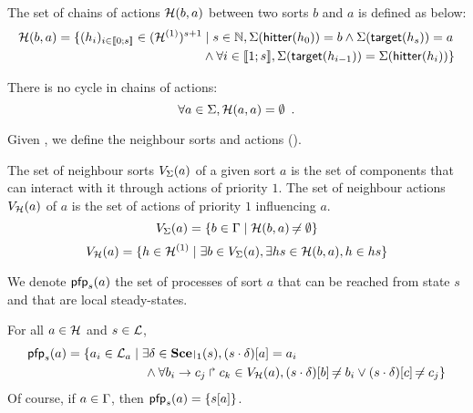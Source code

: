 \begin{definition}
\label{def:chainsactions}
  The set of chains of actions $\mathcal{H}(b, a)$ between two sorts $b$ and $a$ is defined as below:
  \begin{align*}
  \mathcal{H}(b, a) = \{ (h_i)_{i \in \llbracket 0; s \rrbracket} \in (\mathcal{H}^{(1)})^{s+1} &\mid s \in \mathbb{N}, \Sigma(\mathsf{hitter}(h_0)) = b \wedge \Sigma(\mathsf{target}(h_s)) = a \\
    & \wedge \forall i \in \llbracket 1; s \rrbracket, \Sigma(\mathsf{target}(h_{i-1})) = \Sigma(\mathsf{hitter}(h_{i})) \}
  \end{align*}
\end{definition}

\begin{criterion}
\label{cr:cyclefreeness}
  There is no cycle in chains of actions:
  $$\forall a \in \Sigma, \mathcal{H}(a, a) = \emptyset \enspace.$$
\end{criterion}

Given , we define the neighbour  sorts and actions ().
\begin{definition}
\label{def:neighbors}
  The set of neighbour sorts $V_\Sigma(a)$ of a given sort $a$ is the set of components that can interact with it through actions of priority $1$.
  The set of neighbour actions $V_{\mathcal{H}}(a)$ of $a$ is the set of actions of priority $1$ influencing $a$.
  $$V_\Sigma(a) = \{ b \in \Gamma \mid \mathcal{H}(b, a) \not\nobreak\mkern -2mu = \emptyset \}$$
  $$V_{\mathcal{H}}(a) = \{ h \in \mathcal{H}^{(1)} \mid \exists b \in V_\Sigma(a), \exists hs \in \mathcal{H}(b,a), h \in hs \}$$
\end{definition}

We denote $\mathsf{pfp}_s(a)$ the set of processes of sort $a$ that can be reached from state $s$ and that are local steady-states.
\begin{definition}
\label{def:pfp}
  For all $a \in \mathcal{H}$ and $s \in \mathcal{L}$,
  \begin{align*}
    \pfp_s(a) = \{ a_i \in \PHl_a &\mid \exists \delta \in \restriction{\Sce}{1}(s), \PHget{(s \PHplay \delta)}{a} = a_i \\
    & \quad \wedge \forall \PHhit{b_i}{c_j}{c_k} \in \Vh(a), \PHget{(s \PHplay \delta)}{b} \neq b_i \vee \PHget{(s \PHplay \delta)}{c} \neq c_j \}
  \end{align*}
  Of course, if $a \in \Gamma$, then $\mathsf{pfp}_s(a) = \{ {s[a]} \}$.
\end{definition}

